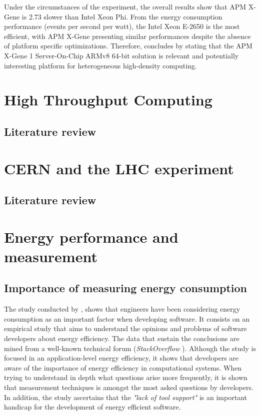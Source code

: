 Under the circumstances of the experiment, the overall results show that APM X-Gene 
is 2.73 slower than Intel Xeon Phi. From the energy consumption performance (events
per second per watt), the Intel Xeon E-2650 is the most efficient, with APM X-Gene
presenting similar performances despite the absence of platform specific 
optimizations. Therefore, \cite{ACAT14ARMDAVID} concludes by stating that the APM
X-Gene 1 Server-On-Chip ARMv8 64-bit solution is relevant and potentially interesting
platform for heterogeneous high-density computing. 

\section{High Throughput Computing}
\subsection{Literature review}



\section{CERN and the LHC experiment}
\subsection{Literature review}



\section{Energy performance and measurement}
\subsection{Importance of measuring energy consumption}

The study conducted by \cite{QUESTIONS_ENERGY}, shows that engineers have been
considering energy consumption as an important factor when developing software.
It consists on an empirical study that aims to understand the opinions and
problems of software developers about energy efficiency. The data that sustain
the conclusions are  mined from
a well-known technical forum (\textit{StackOverflow} \cite{STACKOVERFLOW}).
Although the study is focused in an application-level energy efficiency, it
shows that developers are aware of the importance of energy efficiency in 
computational systems. When trying to understand in depth what questions arise 
more frequently, it is shown that measurement techniques is amongst the most
asked questions by developers. In addition, the study ascertains that the 
\textit{"lack of tool support"} is an important handicap for the development of 
energy efficient software.






